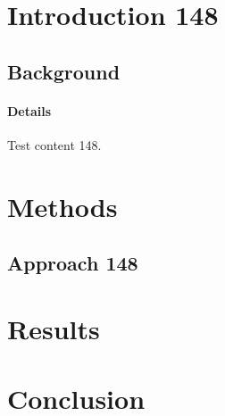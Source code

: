 \documentclass{article}
\begin{document}
\section{Introduction 148}
\subsection{Background}
\paragraph{Details} Test content 148.
\section{Methods}
\subsection{Approach 148}
\section{Results}
\section{Conclusion}
\end{document}
